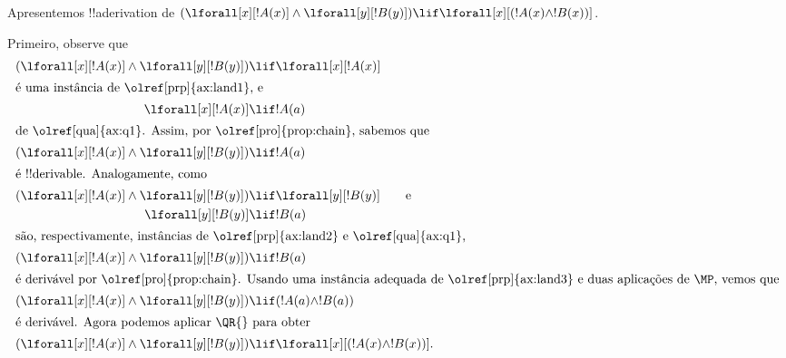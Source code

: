 \documentclass[../../../include/open-logic-section]{subfiles}
\begin{document}


\begin{ex}
Apresentemos !!a{derivation} de $(\lforall[x][!A(x)] \land
\lforall[y][!B(y)]) \lif \lforall[x][(!A(x) \land !B(x))]$.

Primeiro, observe que
\begin{align*}
  (\lforall[x][!A(x)] \land \lforall[y][!B(y)]) & \lif \lforall[x][!A(x)]\\
  \intertext{é uma instância de \olref[prp]{ax:land1}, e}
  \lforall[x][!A(x)] & \lif !A(a) \\
  \intertext{de \olref[qua]{ax:q1}. Assim, por \olref[pro]{prop:chain}, sabemos que}
  (\lforall[x][!A(x)] \land \lforall[y][!B(y)]) & \lif !A(a) \\
  \intertext{é !!{derivable}. Analogamente, como}
  (\lforall[x][!A(x)] \land \lforall[y][!B(y)]) & \lif \lforall[y][!B(y)] \qquad\text{e}\\
    \lforall[y][!B(y)] & \lif !B(a)\\
    \intertext{são, respectivamente, instâncias de \olref[prp]{ax:land2} e \olref[qua]{ax:q1},}
    (\lforall[x][!A(x)] \land \lforall[y][!B(y)]) & \lif !B(a)\\
    \intertext{é derivável por \olref[pro]{prop:chain}. Usando uma instância adequada de \olref[prp]{ax:land3} e duas aplicações de~\MP, vemos que}
    (\lforall[x][!A(x)] \land \lforall[y][!B(y)]) & \lif (!A(a) \land !B(a))\\
    \intertext{é derivável. Agora podemos aplicar \QR{} para obter}
(\lforall[x][!A(x)] \land \lforall[y][!B(y)]) & \lif \lforall[x][(!A(x) \land !B(x))].
\end{align*}
\end{ex}
\end{document}
